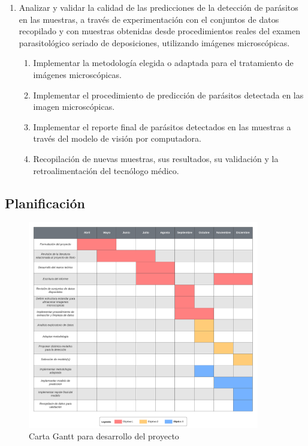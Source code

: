 \documentclass[letter,12pt]{report}
\begin{document}
\begin{enumerate}
    \item Analizar y validar la calidad de las predicciones de la detección de parásitos en
        las muestras, a través de experimentación con el conjuntos de datos recopilado y
        con muestras obtenidas desde procedimientos reales del examen parasitológico
        seriado de deposiciones, utilizando imágenes microscópicas.
        \begin{enumerate}
            \item Implementar la metodología elegida o adaptada para el tratamiento de
                imágenes microscópicas.
            \item Implementar el procedimiento de predicción de parásitos detectada en las
                imagen microscópicas.
            \item Implementar el reporte final de parásitos detectados en las muestras a
                través del modelo de visión por computadora.
            \item Recopilación de nuevas muestras, sus resultados, su validación y la
                retroalimentación del tecnólogo médico.
        \end{enumerate}
\end{enumerate}

\subsection{Planificación}
\begin{figure}[H]
    \centering
    \includegraphics[width=0.9\textwidth]{gantt}
    \caption{Carta Gantt para desarrollo del proyecto}
    \label{fig:gantt}
\end{figure}
\end{document}
